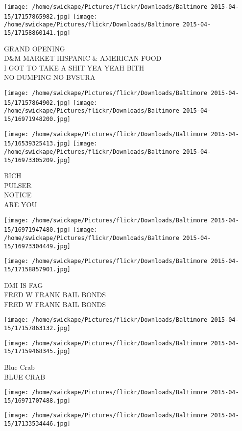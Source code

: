 \documentclass[10pt,letterpaper]{article}
\begin{document}
\texttt{[image: /home/swickape/Pictures/flickr/Downloads/Baltimore 2015-04-15/17157865982.jpg]}
\texttt{[image: /home/swickape/Pictures/flickr/Downloads/Baltimore 2015-04-15/17158860141.jpg]}

GRAND OPENING\\
D\&M MARKET HISPANIC \& AMERICAN FOOD\\
I GOT TO TAKE A SHIT YEA YEAH BITH\\
NO DUMPING NO BVSURA
\pagebreak

\texttt{[image: /home/swickape/Pictures/flickr/Downloads/Baltimore 2015-04-15/17157864902.jpg]}
\texttt{[image: /home/swickape/Pictures/flickr/Downloads/Baltimore 2015-04-15/16971948200.jpg]}

\texttt{[image: /home/swickape/Pictures/flickr/Downloads/Baltimore 2015-04-15/16539325413.jpg]}
\texttt{[image: /home/swickape/Pictures/flickr/Downloads/Baltimore 2015-04-15/16973305209.jpg]}

BICH\\
PULSER\\
NOTICE\\
ARE YOU
\pagebreak

\texttt{[image: /home/swickape/Pictures/flickr/Downloads/Baltimore 2015-04-15/16971947480.jpg]}
\texttt{[image: /home/swickape/Pictures/flickr/Downloads/Baltimore 2015-04-15/16973304449.jpg]}

\texttt{[image: /home/swickape/Pictures/flickr/Downloads/Baltimore 2015-04-15/17158857901.jpg]}

DMI IS FAG\\
FRED W FRANK BAIL BONDS\\
FRED W FRANK BAIL BONDS
\pagebreak

\texttt{[image: /home/swickape/Pictures/flickr/Downloads/Baltimore 2015-04-15/17157863132.jpg]}

\vspace{0.25in}
\texttt{[image: /home/swickape/Pictures/flickr/Downloads/Baltimore 2015-04-15/17159468345.jpg]}

Blue Crab\\
BLUE CRAB
\pagebreak

\texttt{[image: /home/swickape/Pictures/flickr/Downloads/Baltimore 2015-04-15/16971707488.jpg]}

\vspace{0.25in}
\texttt{[image: /home/swickape/Pictures/flickr/Downloads/Baltimore 2015-04-15/17133534446.jpg]}
\end{document}
